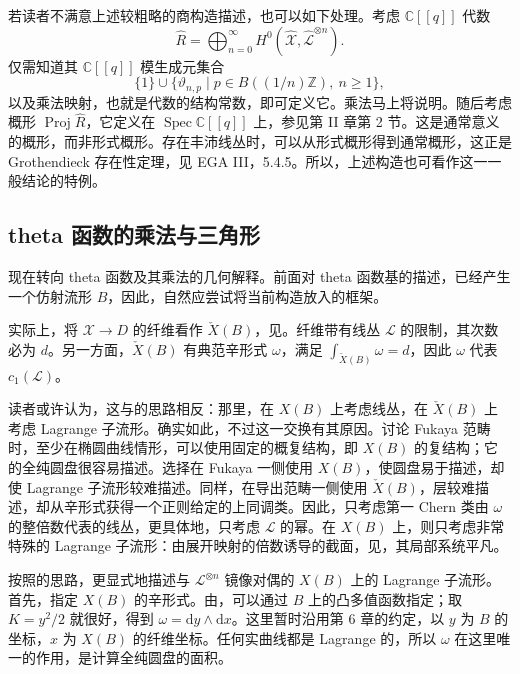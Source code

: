 若读者不满意上述较粗略的商构造描述，也可以如下处理。考虑 $\mathbb C[[q]]$ 代数
\[
\widehat R=\bigoplus_{n=0}^\infty
H^0(\widehat{\mathcal X},\widehat{\mathcal L}^{\otimes n}).
\]
仅需知道其 $\mathbb C[[q]]$ 模生成元集合
\[
\{1\}\cup\{\vartheta_{n,p}\mid p\in B((1/n)\mathbb Z),\ n\geq1\},
\]
以及乘法映射，也就是代数的结构常数，即可定义它。乘法马上将说明。随后考虑概形 $\operatorname{Proj}\widehat R$，它定义在 $\operatorname{Spec}\mathbb C[[q]]$ 上，参见第 II 章第 2 节。这是通常意义的概形，而非形式概形。存在丰沛线丛时，可以从形式概形得到通常概形，这正是 Grothendieck 存在性定理，见 EGA III，5.4.5。所以，上述构造也可看作这一一般结论的特例。

\subsection{theta 函数的乘法与三角形}\label{sec:8.4.2}

现在转向 theta 函数及其乘法的几何解释。前面对 theta 函数基的描述，已经产生一个仿射流形 $B$，因此，自然应尝试将当前构造放入的框架。

实际上，将 $\mathcal X\to D$ 的纤维看作 $\check X(B)$，见。纤维带有线丛 $\mathcal L$ 的限制，其次数必为 $d$。另一方面，$\check X(B)$ 有典范辛形式 $\omega$，满足 $\int_{\check X(B)}\omega=d$，因此 $\omega$ 代表 $c_1(\mathcal L)$。

读者或许认为，这与的思路相反：那里，在 $X(B)$ 上考虑线丛，在 $\check X(B)$ 上考虑 Lagrange 子流形。确实如此，不过这一交换有其原因。讨论 Fukaya 范畴时，至少在椭圆曲线情形，可以使用固定的概复结构，即 $X(B)$ 的复结构；它的全纯圆盘很容易描述。选择在 Fukaya 一侧使用 $X(B)$，使圆盘易于描述，却使 Lagrange 子流形较难描述。同样，在导出范畴一侧使用 $\check X(B)$，层较难描述，却从辛形式获得一个正则给定的上同调类。因此，只考虑第一 Chern 类由 $\omega$ 的整倍数代表的线丛，更具体地，只考虑 $\mathcal L$ 的幂。在 $X(B)$ 上，则只考虑非常特殊的 Lagrange 子流形：由展开映射的倍数诱导的截面，见，其局部系统平凡。

按照的思路，更显式地描述与 $\mathcal L^{\otimes n}$ 镜像对偶的 $X(B)$ 上的 Lagrange 子流形。首先，指定 $X(B)$ 的辛形式。由，可以通过 $B$ 上的凸多值函数指定；取 $K=y^2/2$ 就很好，得到 $\omega=\mathrm dy\wedge\mathrm dx$。这里暂时沿用第 6 章的约定，以 $y$ 为 $B$ 的坐标，$x$ 为 $X(B)$ 的纤维坐标。任何实曲线都是 Lagrange 的，所以 $\omega$ 在这里唯一的作用，是计算全纯圆盘的面积。

